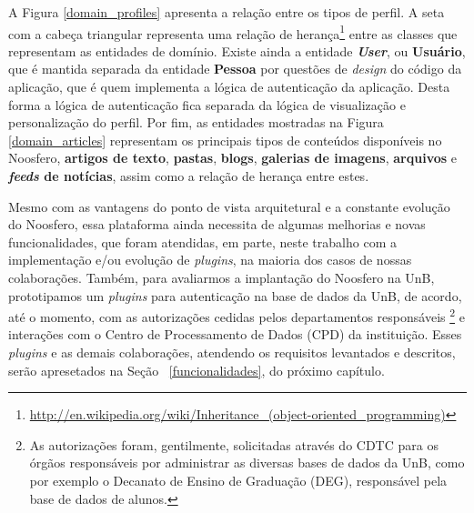 A Figura \ref{domain_profiles} apresenta a relação entre os tipos de perfil.
A seta com a cabeça triangular representa uma relação de herança\footnote{%
\url{http://en.wikipedia.org/wiki/Inheritance_(object-oriented_programming)}}
entre as classes que representam as entidades de domínio.
%
Existe ainda a entidade \textbf{\textit{User}}, ou \textbf{Usuário}, que é
mantida separada da entidade \textbf{Pessoa} por questões de \textit{design}
do código da aplicação, que é quem implementa a lógica de autenticação da
aplicação.
%
Desta forma a lógica de autenticação fica separada da lógica de
visualização e personalização do perfil.
%
Por fim, as entidades mostradas na Figura \ref{domain_articles} representam os
principais tipos de conteúdos disponíveis no Noosfero, \textbf{artigos
de texto}, \textbf{pastas}, \textbf{blogs}, \textbf{galerias de imagens},
\textbf{arquivos} e \textbf{\textit{feeds} de notícias}, assim como a
relação de herança entre estes.

Mesmo com as vantagens do ponto de vista arquitetural e a constante evolução do Noosfero,
essa plataforma ainda necessita de algumas melhorias e novas funcionalidades, que foram
atendidas, em parte, neste trabalho com a implementação e/ou evolução de \textit{plugins}, na
maioria dos casos de nossas colaborações.
%
Também, para avaliarmos a implantação do Noosfero na UnB, prototipamos um \textit{plugins} para autenticação
na base de dados da UnB, de acordo, até o momento, com as autorizações cedidas pelos departamentos responsáveis%
\footnote{As autorizações foram, gentilmente, solicitadas através do CDTC para os órgãos responsáveis por administrar
as diversas bases de dados da UnB, como por exemplo o Decanato de Ensino de Graduação (DEG), responsável pela
base de dados de alunos.} e interações com o Centro de Processamento de Dados (CPD) da instituição. Esses
\textit{plugins} e as demais colaborações, atendendo os requisitos levantados e descritos, serão apresetados na Seção
~\ref{funcionalidades}, do próximo capítulo.
